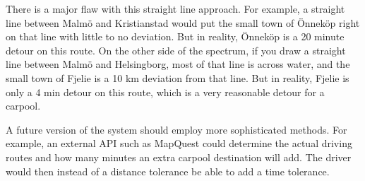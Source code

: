 \documentclass{article}
\begin{document}
There is a major flaw with this straight line approach. For example, a straight line between Malmö and Kristianstad would put the small town of Önneköp right on that line with little to no deviation. But in reality, Önneköp is a 20 minute detour on this route. On the other side of the spectrum, if you draw a straight line between Malmö and Helsingborg, most of that line is across water, and the small town of Fjelie is a 10 km deviation from that line. But in reality, Fjelie is only a 4 min detour on this route, which is a very reasonable detour for a carpool.

A future version of the system should employ more sophisticated methods. For example, an external API such as MapQuest could determine the actual driving routes and how many minutes an extra carpool destination will add. The driver would then instead of a distance tolerance be able to add a time tolerance.
\end{document}

